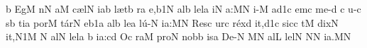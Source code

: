 


\smallskip

\Internote
\nosolesmescustos
\initiumgregorianum
\znotes\fissum{1pt}\bmolle b\en
{}%
\sgn {}E{g}\punctum M\egn
\sgn {}{\'\i}n\punctum N\egn
\sgn {}a{}\punctum M\egn
\spatium
\begingroup
\bgenerale
\sgn c{\ae}l\punctum N\egn
\sgn {}i{}\punctum a\augmentum b\egn
\spatium
\asteriscus
\spatium
\sgn l{\ae}t\punctum b\egn
{}r\punctum a\egn
\sgn {}e,\episem b1\punctum N\egn
\spatium
\spatium
\sgn {}al\punctum b\egn
\sgn lel\punctum a\egn
{}i\punctum N\egn
\sgn {}a:\punctum M\augmentum N\egn
\spatium
\divisiominor
\spatium
i{-}\punctum M\egn
\sgn {}a{}\episem d1\punctum c\egn
\spatium
{}em\punctum c\egn
\spatium
\sgn m{e}-\punctum d\egn
\custos c
\lineaproxima
{}u{-}\punctum c\egn
\sgn {}{\'\i}s\punctum b\egn
\sgn t{i}{}\punctum a\egn
\spatium
\sgn por\punctum M\egn
\sgn t{\'a}r\punctum N\egn
\sgn {}e{}\episem b1\punctum a\egn
\spatium
\sgn {}al\punctum b\egn
\sgn le{}\punctum a\egn
\sgn l{\'u}{-}\punctum N\egn
\sgn ia:\punctum M\augmentum N\egn
\spatium
\divisiominor
\spatium
\sgn Res\punctum c\egn
\sgn {}ur\punctum c\egn
\sgn r{\'e}x\punctum d\egn
\sgn {}i{t,}\episem d1\punctum c\egn
\spatium
\sgn sic\punctum c\egn
{}t\punctum M\egn
\spatium
\sgn dix\punctum N\egn
\sgn {}i{t,}\episem N1\punctum M\egn
\spatium
\custos N
\lineaproxima
\sgn {}al\punctum N\egn
\sgn lel\punctum a\egn
{}\punctum b\egn
\sgn ia:\punctum c\augmentum d\egn
\spatium
\divisiomaior
\spatium
\sgn {}O{}\punctum c\egn
\sgn ra{}\punctum M\egn
\spatium
\sgn pro\punctum N\egn
\spatium
\sgn n{o}b\punctum b\egn
\sgn {}is\punctum a\egn
\spatium
\sgn D{e}{-}\punctum N\egn
{}\punctum M\augmentum N\egn
\spatium
\sgn {}al\punctum L\egn
\sgn lel\punctum N\egn
{}\punctum N\spatiumparvum\punctum N\egn
\sgn ia.\punctum M\augmentum N\egn
\spatium
\endgroup
\Finisgregoriana

